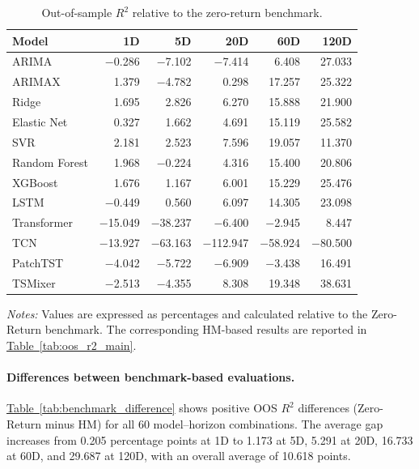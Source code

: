 \documentclass[runningheads,orivec]{llncs}
\begin{document}
\begin{table}[htbp]
\centering
\caption{Out-of-sample $R^2$ relative to the zero-return benchmark.}\label{tab:benchmark_comparison}
{\small
\setlength{\tabcolsep}{5pt}
\begin{tabular}{lrrrrr}
\hline
Model & 1D & 5D & 20D & 60D & 120D \\
\hline
ARIMA          & $-$0.286 & $-$7.102 &  $-$7.414 &   6.408 & 27.033 \\
ARIMAX         &  1.379 & $-$4.782 &   0.298 &  17.257 & 25.322 \\
Ridge          &  1.695 &  2.826 &   6.270 &  15.888 & 21.900 \\
Elastic Net    &  0.327 &  1.662 &   4.691 &  15.119 & 25.582 \\
SVR            &  2.181 &  2.523 &   7.596 &  19.057 & 11.370 \\
Random Forest  &  1.968 & $-$0.224 &   4.316 &  15.400 & 20.806 \\
XGBoost        &  1.676 &  1.167 &   6.001 &  15.229 & 25.476 \\
LSTM           & $-$0.449 &  0.560 &   6.097 &  14.305 & 23.098 \\
Transformer    & $-$15.049 & $-$38.237 &  $-$6.400 &  $-$2.945 &  8.447 \\
TCN            & $-$13.927 & $-$63.163 & $-$112.947 & $-$58.924 & $-$80.500 \\
PatchTST       & $-$4.042 & $-$5.722 &  $-$6.909 &  $-$3.438 & 16.491 \\
TSMixer        & $-$2.513 & $-$4.355 &   8.308 &  19.348 & 38.631 \\
\hline
\end{tabular}}
\par\vspace{4pt}\parbox{\linewidth}{\linespread{1.2}\selectfont\footnotesize\textit{Notes:} Values are expressed as percentages and calculated relative to the Zero-Return benchmark. The corresponding HM-based results are reported in \hyperref[tab:oos_r2_main]{Table~\ref*{tab:oos_r2_main}}.\par}
\end{table}

\paragraph{Differences between benchmark-based evaluations.}
\hyperref[tab:benchmark_difference]{Table~\ref*{tab:benchmark_difference}} shows positive OOS $R^2$ differences (Zero-Return minus HM) for all 60 model--horizon combinations. The average gap increases from 0.205 percentage points at 1D to 1.173 at 5D, 5.291 at 20D, 16.733 at 60D, and 29.687 at 120D, with an overall average of 10.618 points.
\end{document}

